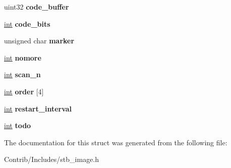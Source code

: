 \begin{DoxyCompactItemize}
\begin{tabbing}
\end{tabbing}\item 
uint32 {\bfseries code\+\_\+buffer}\hypertarget{structjpeg_a3c38af98586cc9ac2e0156ca03899caf}{}\label{structjpeg_a3c38af98586cc9ac2e0156ca03899caf}

\item 
\hyperlink{_s_d_l__thread_8h_a6a64f9be4433e4de6e2f2f548cf3c08e}{int} {\bfseries code\+\_\+bits}\hypertarget{structjpeg_aed1a53449123d6026879e8fb74595bdc}{}\label{structjpeg_aed1a53449123d6026879e8fb74595bdc}

\item 
unsigned char {\bfseries marker}\hypertarget{structjpeg_a4ce9a8c265ab708ced398cd1043870f8}{}\label{structjpeg_a4ce9a8c265ab708ced398cd1043870f8}

\item 
\hyperlink{_s_d_l__thread_8h_a6a64f9be4433e4de6e2f2f548cf3c08e}{int} {\bfseries nomore}\hypertarget{structjpeg_a1c2bf83f59d1b9fe9f3fb386c8e4f3ce}{}\label{structjpeg_a1c2bf83f59d1b9fe9f3fb386c8e4f3ce}

\item 
\hyperlink{_s_d_l__thread_8h_a6a64f9be4433e4de6e2f2f548cf3c08e}{int} {\bfseries scan\+\_\+n}\hypertarget{structjpeg_a83fa57e78c92df27fa6e1cdffdbf6e39}{}\label{structjpeg_a83fa57e78c92df27fa6e1cdffdbf6e39}

\item 
\hyperlink{_s_d_l__thread_8h_a6a64f9be4433e4de6e2f2f548cf3c08e}{int} {\bfseries order} \mbox{[}4\mbox{]}\hypertarget{structjpeg_ab5bcea39a41e0f295efe87a7d645d2a0}{}\label{structjpeg_ab5bcea39a41e0f295efe87a7d645d2a0}

\item 
\hyperlink{_s_d_l__thread_8h_a6a64f9be4433e4de6e2f2f548cf3c08e}{int} {\bfseries restart\+\_\+interval}\hypertarget{structjpeg_a2d8a5441539293f0d0f134a878d4281a}{}\label{structjpeg_a2d8a5441539293f0d0f134a878d4281a}

\item 
\hyperlink{_s_d_l__thread_8h_a6a64f9be4433e4de6e2f2f548cf3c08e}{int} {\bfseries todo}\hypertarget{structjpeg_a2b60bb9be290ebdffdb0febeb5a5cb27}{}\label{structjpeg_a2b60bb9be290ebdffdb0febeb5a5cb27}

\end{DoxyCompactItemize}


The documentation for this struct was generated from the following file\+:\begin{DoxyCompactItemize}
\item 
Contrib/\+Includes/stb\+\_\+image.\+h\end{DoxyCompactItemize}
